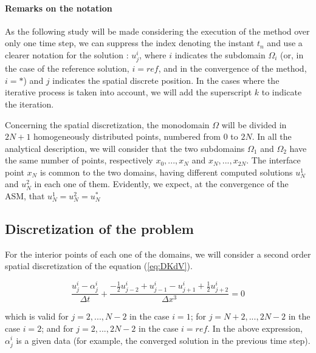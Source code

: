 \paragraph{Remarks on the notation}


\indent As the following study will be made considering the execution of the method over only one time step, we can suppress the index denoting the instant $t_n$ and use a clearer notation for the solution : $u_j^i$, where $i$ indicates the subdomain $\Omega_i$ (or, in the case of the reference solution, $i = ref$, and in the convergence of the method, $i = *$) and $j$ indicates the spatial discrete position. In the cases where the iterative process is taken into account, we will add the superscript $k$ to indicate the iteration.

\indent Concerning the spatial discretization, the monodomain $\Omega$ will be divided in $2N + 1$ homogeneously distributed points, numbered from $0$ to $2N$. In all the analytical description, we will consider that the two subdomains $\Omega_1$ and $\Omega_2$ have the same number of points, respectively $x_0,...,x_N$ and $x_N,...,x_{2N}$. The interface point $x_N$ is common to the two domains, having different computed solutions $u_N^1$ and $u_N^2$ in each one of them. Evidently, we expect, at the convergence of the ASM, that $u_N^1 = u_N^2 = u_N^*$

\subsection{Discretization of the problem}

\indent For the interior points of each one of the domains, we will consider a second order spatial discretization of the equation (\ref{eq:DKdV}).

\begin{equation}
    \label{eq:FDdiscretization}
    \frac{u_j^i - \alpha_j^i}{\Delta t} + \frac{-\frac{1}{2}u_{j-2}^i + u_{j-1}^i - u_{j+1}^i + \frac{1}{2}u_{j+2}^i }{\Delta x ^3} = 0
\end{equation}

\noindent which is valid for $j=2,...,N-2$ in the case $i=1$; for $j=N+2,...,2N-2$ in the case $i=2$; and for $j=2,...,2N-2$ in the case $i=ref$. In the above expression, $\alpha_j^i$ is a given data (for example, the converged solution in the previous time step).

